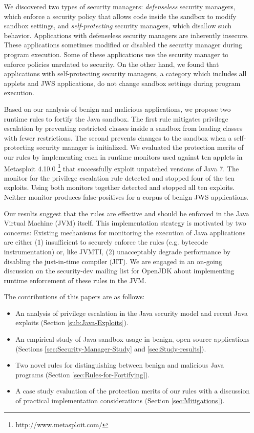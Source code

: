 \documentclass{sig-alternate}
\begin{document}
We discovered two types of security managers: \emph{defenseless} security
managers, which enforce a security policy that allows code inside
the sandbox to modify sandbox settings, and \emph{self-protecting}
security managers, which disallow such behavior. Applications with
defenseless security managers are inherently insecure. These applications
sometimes modified or disabled the security manager during program
execution. Some of these applications use the security manager to
enforce policies unrelated to security. On the other hand, we found
that applications with self-protecting security managers, a category
which includes all applets and JWS applications, do not change sandbox settings during program execution. 

Based on our analysis of benign and malicious applications, we propose two runtime rules to fortify the Java sandbox. The first rule mitigates privilege escalation by preventing restricted classes inside a sandbox from loading classes with fewer restrictions. The second prevents changes to the sandbox when a self-protecting security manager is initialized. We evaluated the protection merits of our rules by implementing each in runtime monitors used against ten applets in Metasploit 4.10.0%
\footnote{http://www.metasploit.com/%
} that successfully exploit unpatched versions of Java 7. The monitor for the privilege
escalation rule detected and stopped four of the ten exploits.
Using both monitors together detected and stopped all ten exploits. Neither monitor produces false-positives for a corpus of benign JWS applications.

Our results suggest that the rules are effective and should be enforced in the Java Virtual Machine (JVM) itself. This implementation strategy is motivated by two concerns: Existing mechanisms for monitoring the execution of Java applications are either (1) insufficient to securely enforce the rules (e.g. bytecode instrumentation) or, like JVMTI, (2) unacceptably degrade performance by disabling the just-in-time compiler (JIT). We are engaged in an on-going discussion on the security-dev mailing list for OpenJDK about implementing runtime enforcement of these rules in the JVM.

The contributions of this papers are as follows:
\begin{itemize}
\item An analysis of privilege escalation in the Java security model and
recent Java exploits (Section \ref{sub:Java-Exploits}).
\item An empirical study of Java sandbox usage in benign, open-source applications
(Sections \ref{sec:Security-Manager-Study} and \ref{sec:Study-results}).
\item Two novel rules for distinguishing between benign and malicious Java
programs (Section \ref{sec:Rules-for-Fortifying}).
\item A case study evaluation of the protection merits of our rules with a discussion of practical implementation considerations (Section \ref{sec:Mitigations}).
\end{itemize}
\end{document}
